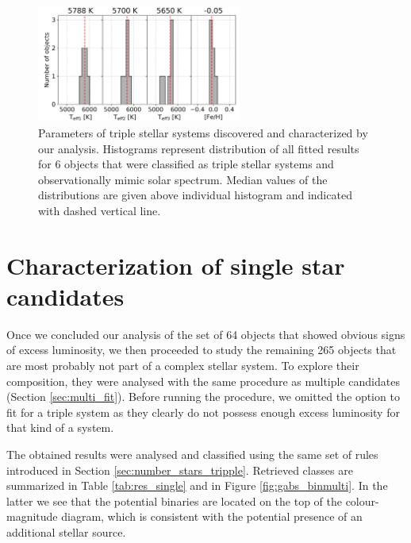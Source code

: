 \begin{figure}
	\centering
	\includegraphics[width=0.6\textwidth]{triple_stars_params_multi.png}
	\caption{Parameters of triple stellar systems discovered and characterized by our analysis. Histograms represent distribution of all fitted results for 6 objects that were classified as triple stellar systems and observationally mimic solar spectrum. Median values of the distributions are given above individual histogram and indicated with dashed vertical line.}
	\label{fig:triple_params}
\end{figure}

\section{Characterization of single star candidates}
\label{sec:single_fit}
Once we concluded our analysis of the set of 64 objects that showed obvious signs of excess luminosity, we then proceeded to study the remaining 265 objects that are most probably not part of a complex stellar system. To explore their composition, they were analysed with the same procedure as multiple candidates (Section \ref{sec:multi_fit}). Before running the procedure, we omitted the option to fit for a triple system as they clearly do not possess enough excess luminosity for that kind of a system.

The obtained results were analysed and classified using the same set of rules introduced in Section \ref{sec:number_stars_tripple}. Retrieved classes are summarized in Table \ref{tab:res_single} and in Figure \ref{fig:gabs_binmulti}. In the latter we see that the potential binaries are located on the top of the colour-magnitude diagram, which is consistent with the potential presence of an additional stellar source.

